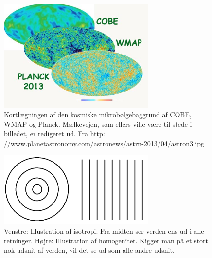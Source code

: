 \begin{figure}[h]
	\centering
	\includegraphics[width=0.7\textwidth]{Astrofysik/Astrofig/CMB.jpg}
	\caption{Kortlægningen af den kosmiske mikrobølgebaggrund af COBE, WMAP og
		Planck. Mælkevejen, som ellers ville være til stede i billedet, er redigeret ud. Fra http:
		//www.planetastronomy.com/astronews/astrn-2013/04/astron3.jpg}
	\label{CMB}
\end{figure}

\begin{figure}[h]
	\centering
	\includegraphics[width=0.7\textwidth]{Astrofysik/Astrofig/isohomo.png}
	\caption{Venstre: Illustration af isotropi. Fra midten ser verden ens ud i alle retninger. Højre: Illustration af homogenitet. Kigger man på et stort nok udsnit af verden, vil det se ud som alle andre udsnit.}
	\label{isohomo}
\end{figure}

